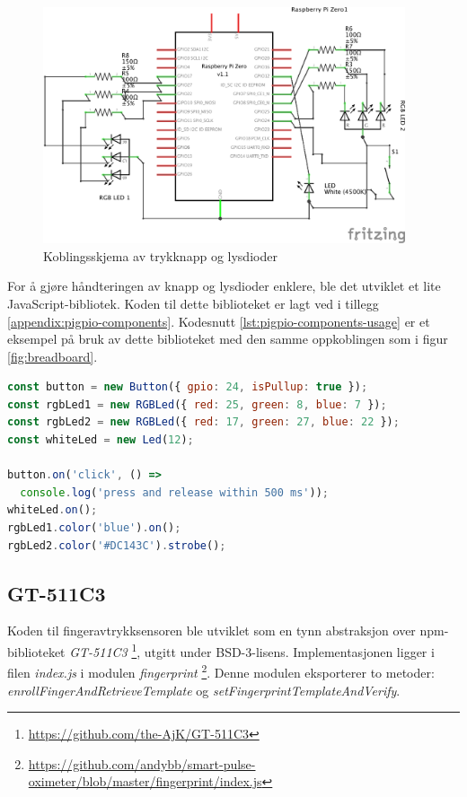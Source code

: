 \begin{figure}
\includegraphics[width=0.95\textwidth, center]{fig/prototype/schmeatic}
\caption{Koblingsskjema av trykknapp og lysdioder}
\label{fig:schematics}
\end{figure}

For å gjøre håndteringen av knapp og lysdioder enklere, ble det utviklet et lite JavaScript-bibliotek.
Koden til dette biblioteket er lagt ved i tillegg \ref{appendix:pigpio-components}. Kodesnutt
\ref{lst:pigpio-components-usage} er et eksempel på bruk av dette biblioteket med den samme oppkoblingen som i
figur \ref{fig:breadboard}.

\begin{lstlisting}[frame=single, language=JavaScript,
    caption=Bruk av pigpio-components, label=lst:pigpio-components-usage]
const button = new Button({ gpio: 24, isPullup: true });
const rgbLed1 = new RGBLed({ red: 25, green: 8, blue: 7 });
const rgbLed2 = new RGBLed({ red: 17, green: 27, blue: 22 });
const whiteLed = new Led(12);

button.on('click', () =>
  console.log('press and release within 500 ms'));
whiteLed.on();
rgbLed1.color('blue').on();
rgbLed2.color('#DC143C').strobe();
\end{lstlisting}

\subsection{GT-511C3}
Koden til fingeravtrykksensoren ble utviklet som en tynn abstraksjon over \gls{npm}-biblioteket \textit{GT-511C3}
\footnote{\url{https://github.com/the-AjK/GT-511C3}}, utgitt under BSD-3-lisens. Implementasjonen ligger
i filen \textit{index.js} i modulen \textit{fingerprint}
\footnote{\url{https://github.com/andybb/smart-pulse-oximeter/blob/master/fingerprint/index.js}}.
Denne modulen eksporterer to metoder: \textit{enrollFingerAndRetrieveTemplate} og \textit{setFingerprintTemplateAndVerify}.

